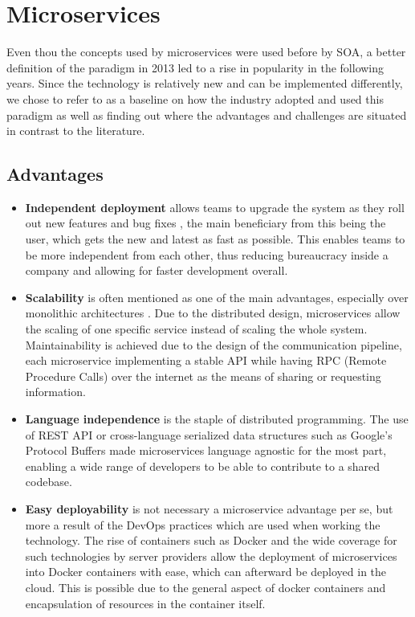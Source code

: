 \section{Microservices}
Even thou the concepts used by microservices were used before by SOA, a better definition of the paradigm in 2013 led to a rise in popularity in the following years\cite{klock}. Since the technology is relatively new and can be implemented differently, we chose to refer to \cite{viggiato} as a baseline on how the industry adopted and used this paradigm as well as finding out where the advantages and challenges are situated in contrast to the literature.

\subsection*{Advantages}
\begin{itemize}
\item \textbf{Independent deployment} allows teams to upgrade the system as they roll out new features and bug fixes \cite{newman}, the main beneficiary from this being the user, which gets the new and latest as fast as possible. This enables teams to be more independent from each other, thus reducing bureaucracy inside a company and allowing for faster development overall. 
\item \textbf{Scalability} is often mentioned as one of the main advantages, especially over monolithic architectures \cite{alshuqayran}. Due to the distributed design, microservices allow the scaling of one specific service instead of scaling the whole system.
Maintainability is achieved due to the design of the communication pipeline, each microservice implementing a stable API while having RPC (Remote Procedure Calls) over the internet as the means of sharing or requesting information.
\item \textbf{Language independence} is the staple of distributed programming. The use of REST API or cross-language serialized data structures such as Google's Protocol Buffers made microservices language agnostic for the most part, enabling a wide range of developers to be able to contribute to a shared codebase.
\item \textbf{Easy deployability} is not necessary a microservice advantage per se, but more a result of the DevOps practices which are used when working the technology. The rise of containers such as Docker and the wide coverage for such technologies by server providers allow the deployment of microservices into Docker containers with ease, which can afterward be deployed in the cloud. This is possible due to the general aspect of docker containers and encapsulation of resources in the container itself. 
\end{itemize}

